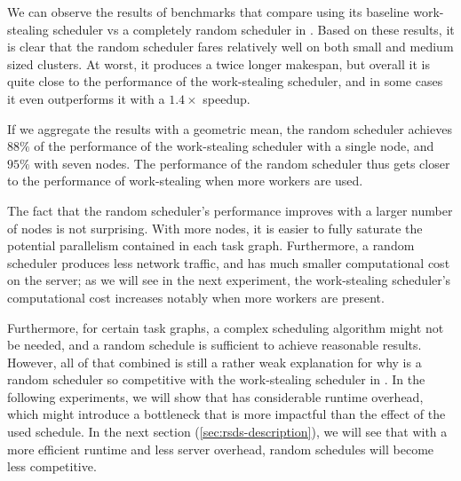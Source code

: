 We can observe the results of benchmarks that compare \dask{} using its
baseline work-stealing scheduler vs a completely random scheduler in .
Based on these results, it is clear that the random scheduler fares relatively well on both small
and medium sized clusters. At worst, it produces a twice longer makespan, but overall it is quite
close to the performance of the work-stealing scheduler, and in some cases it even outperforms it
with a $1.4\times$ speedup.

If we aggregate the results with a geometric mean, the random scheduler achieves
$88\%$ of the performance of the work-stealing scheduler with a single node,
and $95\%$ with seven nodes. The performance of the random scheduler thus gets
closer to the performance of work-stealing when more workers are used.

The fact that the random scheduler's performance improves with a larger number of nodes is not
surprising. With more nodes, it is easier to fully saturate the potential parallelism contained in
each task graph. Furthermore, a random scheduler produces less network traffic, and has much
smaller computational cost on the server; as we will see in the next experiment, the work-stealing
scheduler's computational cost increases notably when more workers are present.

Furthermore, for certain task graphs, a complex scheduling algorithm might not be needed, and a
random schedule is sufficient to achieve reasonable results. However, all of that combined is still
a rather weak explanation for why is a random scheduler so competitive with the work-stealing
scheduler in \dask{}. In the following experiments, we will show that
\dask{} has considerable runtime overhead, which might introduce a bottleneck
that is more impactful than the effect of the used schedule. In the next section
(\ref{sec:rsds-description}), we will see that with a more efficient runtime and less server
overhead, random schedules will become less competitive.



